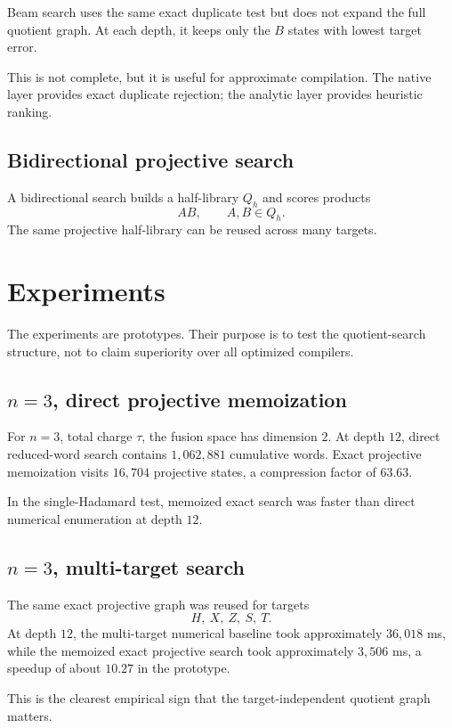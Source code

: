 \documentclass[11pt]{article}
\begin{document}
Beam search uses the same exact duplicate test but does not expand the full quotient graph.  At each depth, it keeps only the $B$ states with lowest target error.

This is not complete, but it is useful for approximate compilation.  The native layer provides exact duplicate rejection; the analytic layer provides heuristic ranking.

\subsection{Bidirectional projective search}

A bidirectional search builds a half-library $Q_h$ and scores products
\[
    AB,
    \qquad A,B\in Q_h.
\]
The same projective half-library can be reused across many targets.

\section{Experiments}

The experiments are prototypes.  Their purpose is to test the quotient-search structure, not to claim superiority over all optimized compilers.

\subsection{$n=3$, direct projective memoization}

For $n=3$, total charge $\tau$, the fusion space has dimension $2$.  At depth $12$, direct reduced-word search contains $1{,}062{,}881$ cumulative words.  Exact projective memoization visits $16{,}704$ projective states, a compression factor of $63.63$.

In the single-Hadamard test, memoized exact search was faster than direct numerical enumeration at depth $12$.

\subsection{$n=3$, multi-target search}

The same exact projective graph was reused for targets
\[
    H,\ X,\ Z,\ S,\ T.
\]
At depth $12$, the multi-target numerical baseline took approximately $36{,}018$ ms, while the memoized exact projective search took approximately $3{,}506$ ms, a speedup of about $10.27$ in the prototype.

This is the clearest empirical sign that the target-independent quotient graph matters.
\end{document}
